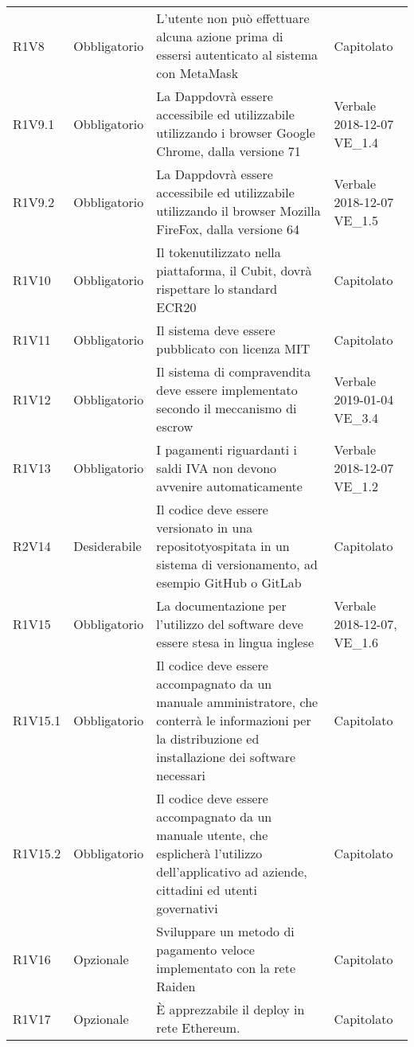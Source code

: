 \begin{longtable}{ >{\centering}p{} >{\centering}p{}
			>{\raggedright}p{} >{\centering}p{}}
R1V8	&	Obbligatorio	&	L'utente non può effettuare alcuna azione prima di essersi autenticato al sistema con MetaMask\glo	&	Capitolato	\tabularnewline
R1V9.1	&	Obbligatorio	&	La Dapp\glosp dovrà essere accessibile ed utilizzabile utilizzando i browser Google Chrome, dalla versione 71	&	Verbale 2018-12-07  VE\_1.4	\tabularnewline
R1V9.2	&	Obbligatorio	&	La Dapp\glosp dovrà essere accessibile ed utilizzabile utilizzando il browser Mozilla FireFox, dalla versione 64	&	Verbale 2018-12-07 VE\_1.5	\tabularnewline
R1V10	&	Obbligatorio	&	Il token\glosp utilizzato nella piattaforma, il Cubit\glo, dovrà rispettare lo standard ECR20\glo	&	Capitolato	\tabularnewline
R1V11	&	Obbligatorio	&	Il sistema deve essere pubblicato con licenza MIT	&	Capitolato	\tabularnewline
R1V12	&	Obbligatorio	&	Il sistema di compravendita deve essere implementato secondo il meccanismo di escrow\glo	&	Verbale 2019-01-04  VE\_3.4	\tabularnewline
R1V13	&	Obbligatorio	&	I pagamenti riguardanti i saldi IVA non devono avvenire automaticamente	&	Verbale 2018-12-07 VE\_1.2	\tabularnewline
R2V14	&	Desiderabile	&	Il codice deve essere versionato in una repositoty\glosp ospitata in un sistema di versionamento, ad esempio GitHub o GitLab	&	Capitolato	\tabularnewline
R1V15	&	Obbligatorio	&	La documentazione per l'utilizzo del software deve essere stesa in lingua inglese	&	Verbale 2018-12-07, VE\_1.6	\tabularnewline
R1V15.1	&	Obbligatorio	&	Il codice deve essere accompagnato da un manuale amministratore, che conterrà le informazioni per la distribuzione ed installazione dei software necessari	&	Capitolato	\tabularnewline
R1V15.2	&	Obbligatorio	&	Il codice deve essere accompagnato da un manuale utente, che esplicherà l'utilizzo dell'applicativo ad aziende, cittadini ed utenti governativi	&	Capitolato	\tabularnewline
R1V16	&	Opzionale	&	Sviluppare un metodo di pagamento veloce implementato con la rete Raiden\glo	&	Capitolato	\tabularnewline
R1V17	&	Opzionale	&	È apprezzabile il deploy in rete Ethereum\glo.	&	Capitolato	\tabularnewline
		
		
		
		
	\end{longtable}
